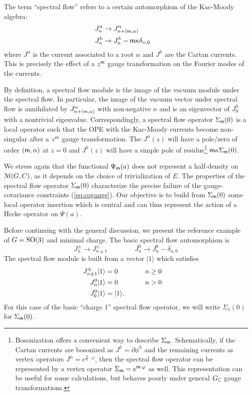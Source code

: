 \documentclass[11pt,a4paper]{article}
\begin{document}
The term ``spectral flow'' refers to a certain automorphism of the Kac-Moody algebra:
\begin{align}
J^\alpha_n &\to J^{\alpha}_{n+({\sf m}, \alpha)} \cr
J^h_n &\to J^h_n - {\sf m} \kappa \delta_{n,0}
\end{align}
where $J^\alpha$ is the current associated to a root $\alpha$ and $J^h$ are the Cartan currents. 
This is precisely the effect of a $z^{\sf m}$ gauge transformation on the Fourier modes of the currents. 

By definition, a spectral flow module is the image of the vacuum module under the spectral flow. In particular, the image of the vacuum vector under spectral flow is annihilated by $J^{\alpha}_{n+({\sf m}, \alpha)}$ with non-negative $n$ and is an eigenvector of  $J^h_0$ with a nontrivial eigenvalue. 
Correspondingly, a spectral flow operator $\Sigma_{{\sf m}}(0)$ is a local operator such that the OPE with the Kac-Moody currents become non-singular after a $z^{\sf m}$ gauge transformation. The $J^{\alpha}(z)$ will have a pole/zero of order $({\sf m}, \alpha)$ at $z=0$ and $J^h(z)$ 
will have a simple pole of residue\footnote{Bosonization offers a convenient way to describe $\Sigma_{{\sf m}}$.
Schematically, if the Cartan currents are bosonized as $J^h = \partial \phi^h$ and the remaining currents as vertex operators $J^\alpha = e^{\frac{\alpha}{\kappa} \cdot \varphi}$, then the spectral flow operator can be represented by a vertex operator $\Sigma_{{\sf m}} = e^{{\sf m} \cdot \varphi}$ as well. This representation can be useful for some calculations, but behaves poorly under general $G_{\mathbb C}$ gauge transformations.} ${\sf m}\kappa \Sigma_{{\sf m}}(0)$.

We stress again that the functional $\Psi_{{\sf m}}(a)$ does not represent a half-density on ${\mathcal M}(G,C)$, as it depends on the 
choice of trivialization of $E$. The properties of the spectral flow operator $\Sigma_{{\sf m}}(0)$ characterize the precise failure of the 
gauge-covariance constraints (\ref{eq:cogauge}). Our objective is to build from $\Sigma_{{\sf m}}(0)$ some local operator insertion which 
is central and can thus represent the action of a Hecke operator on $\Psi(a)$. 

Before continuing with the general discussion, we  present the reference example of $G={\mathrm{SO}}(3)$ and minimal charge. The basic spectral flow automorphism is 
\begin{equation}
J^\pm_n \to J^{\pm}_{n \pm 1} \qquad \qquad J^0_n \to J^0_n - \delta_{n,0}
\end{equation}
The spectral flow module is built from a vector $|1\rangle$ which satisfies 
\begin{align}\label{laterref}
J^{\pm}_{n \pm 1} |1\rangle &=0  \qquad \qquad n\geq 0 \cr
J^0_n |1\rangle &=0  \qquad \qquad n> 0 \cr
J^0_0|1\rangle &= |1\rangle.
\end{align}
For this case of the basic ``charge 1'' spectral flow operator, we will write $\Sigma_1(0)$ for $\Sigma_{\sf m}(0)$.
\end{document}
